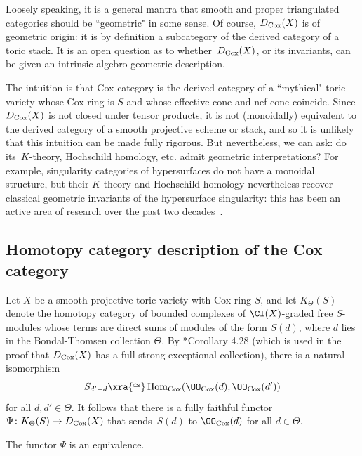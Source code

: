 \documentclass{amsart}
\begin{document}
\begin{remark}\label{rmk:mythical2}
Loosely speaking, it is a general mantra that smooth and proper triangulated categories should be ``geometric" in some sense. Of course, $D_{\operatorname{Cox}}(X)$ is of geometric origin: it is by definition a subcategory of the derived category of a toric stack. It is an open question as to whether~$D_{\operatorname{Cox}}(X)$, or its invariants, can be given an intrinsic algebro-geometric description.

The intuition is that Cox category is the derived category of a ``mythical" toric variety whose Cox ring is $S$ and whose effective cone and nef cone coincide. Since $D_{\operatorname{Cox}}(X)$ is not closed under tensor products, it is not (monoidally) equivalent to the derived category of a smooth projective scheme or stack, and so it is unlikely that this intuition can be made fully rigorous. But nevertheless, we can ask: do its~$K$-theory, Hochschild homology, etc. admit geometric interpretations? For example, singularity categories of hypersurfaces do not have a monoidal structure, but their $K$-theory and Hochschild homology nevertheless recover classical geometric invariants of the hypersurface singularity: this has been an active area of research over the past two decades~\cite{BD20, BFK14a, BFK14b, BP25, BRT+18, BW20a, BW20b,BW22, CT13, Dyckerhoff11, Efimov18,  HP20, KP21, KK24,Pippi22, PV12,  Segal13, Shklyarov14, Shklyarov16}.
\end{remark}

\subsection{Homotopy category description of the Cox category}
\label{subsec:homotopy}
Let $X$ be a smooth projective toric variety with Cox ring $S$, and let $K_{\Theta}(S)$ denote the homotopy category of bounded complexes of $\Cl(X)$-graded free $S$-modules whose terms are direct sums of modules of the form $S(d)$, where $d$ lies in the Bondal-Thomsen collection $\Theta$. By \cite{BBB+24}*{Corollary 4.28} (which is used in the proof that $D_{\operatorname{Cox}}(X)$ has a full strong exceptional collection), there is a natural isomorphism
$$
S_{d' - d} \xra{\cong} \Hom_{\Cox}(\OO_{\Cox}(d), \OO_{\Cox}(d'))
$$
for all $d, d' \in \Theta$. It follows that there is a fully faithful functor $\Psi \colon K_{\Theta}(S) \to D_{\operatorname{Cox}}(X)$ that sends~$S(d)$ to $\OO_{\Cox}(d)$ for all $d \in \Theta$.

\begin{thm}
\label{thm:homotopycat}
The functor $\Psi$ is an equivalence.
\end{thm}
\end{document}
